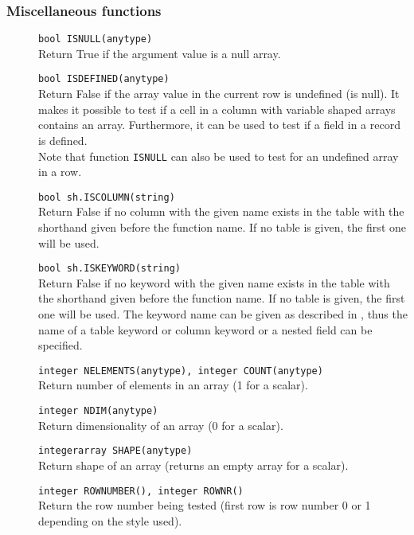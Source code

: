 \subsubsection{Miscellaneous functions}
\begin{description}
  \item[] \texttt{bool ISNULL(anytype)}\\
    Return True if the argument value is a null array.
  \item[] \texttt{bool ISDEFINED(anytype)}\\
    Return False if the array value in the current row is undefined (is null).
    It makes it possible to test if a cell in a column with variable shaped arrays
    contains an array. Furthermore, it can be used to test if a field in a
    record is defined.\\
    Note that function {\tt ISNULL} can also be used to test for an undefined
    array in a row.
  \item[] \texttt{bool sh.ISCOLUMN(string)}\\
    Return False if no column with the given name exists in
    the table with the shorthand given before the function name.
    If no table is given, the first one will be used.
  \item[] \texttt{bool sh.ISKEYWORD(string)}\\
    Return False if no keyword with the given name exists in
    the table with the shorthand given before the function name.
    If no table is given, the first one will be used.
    The keyword name can be given as described in
    , thus
    the name of a table keyword or column keyword or a nested field
    can be specified. 
  \item[] \texttt{integer NELEMENTS(anytype), integer COUNT(anytype)}\\
    Return number of elements in an array (1 for a scalar).
  \item[] \texttt{integer NDIM(anytype)}\\
    Return dimensionality of an array (0 for a scalar).
  \item[] \texttt{integerarray SHAPE(anytype)}\\
    Return shape of an array (returns an empty array for a scalar).
  \item[] \texttt{integer ROWNUMBER(), integer ROWNR()}\\
    Return the row number being tested (first row is row number 0 or 1
    depending on the style used).

\end{description}
